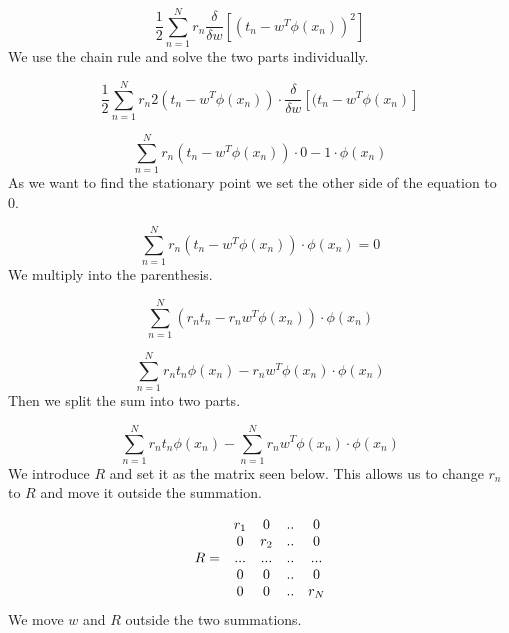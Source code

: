 \documentclass{article}
\begin{document}
\begin{equation*}
  \frac{1}{2}\sum_{n=1}^{N} r_n \frac{\delta}{\delta w} \left[ (t_n - w^T\phi(x_n))^2 \right]
\end{equation*}
We use the chain rule and solve the two parts individually.

\begin{equation*}
    \frac{1}{2}\sum_{n=1}^{N} r_n 2(t_n - w^T\phi(x_n)) \cdot \frac{\delta}{\delta w} \left[ (t_n - w^T\phi(x_n) \right]
\end{equation*}

\begin{equation*}
    \sum_{n=1}^{N} r_n (t_n - w^T\phi(x_n)) \cdot 0 - 1 \cdot \phi(x_n)
\end{equation*}
As we want to find the stationary point we set the other side of the
equation to 0.

\begin{equation*}
    \sum_{n=1}^{N} r_n (t_n - w^T\phi(x_n)) \cdot \phi(x_n) = 0
\end{equation*}
We multiply into the parenthesis.

\begin{equation*}
    \sum_{n=1}^{N} (r_n t_n - r_n w^T\phi(x_n)) \cdot \phi(x_n)
\end{equation*}

\begin{equation*}
    \sum_{n=1}^{N} r_n t_n \phi(x_n) - r_n w^T\phi(x_n) \cdot \phi(x_n)
\end{equation*}
Then we split the sum into two parts. 

\begin{equation*}
    \sum_{n=1}^{N} r_n t_n \phi(x_n) - \sum_{n=1}^{N} r_n w^T\phi(x_n) \cdot \phi(x_n)
\end{equation*}
We introduce $R$ and set it as the matrix seen below. This allows us to
change $r_n$ to $R$ and move it outside the summation.

\begin{equation*}
    \begin{array}{r c c c c}
    &   r_1 & 0   & .. & 0   \\
    &   0   & r_2 & .. & 0   \\
  R =   &  ...  & ... & .. & ...   \\
    &   0   & 0   & .. & 0   \\
    &   0   & 0   & .. & r_N 
    \end{array}
\end{equation*}
We move $w$ and $R$ outside the two summations.
\end{document}
